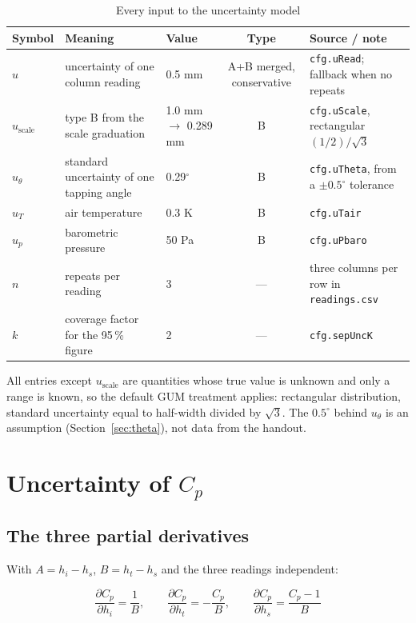 \documentclass[11pt,a4paper]{article}
\newcommand{\Cp}{\ensuremath{C_p}}
\begin{document}
\begin{table}[H]
\centering
\caption{Every input to the uncertainty model}
\small
\begin{tabularx}{\textwidth}{@{}l p{3.4cm} p{2.5cm} c X@{}}
\toprule
Symbol & Meaning & Value & Type & Source / note \\
\midrule
$u$ & uncertainty of one column reading & 0.5 mm & A+B merged, conservative &
\texttt{cfg.uRead}; fallback when no repeats \\
$u_{\text{scale}}$ & type B from the scale graduation & 1.0 mm $\to$ 0.289 mm & B &
\texttt{cfg.uScale}, rectangular $(1/2)/\sqrt{3}$ \\
$u_\theta$ & standard uncertainty of one tapping angle & 0.29$^\circ$ & B &
\texttt{cfg.uTheta}, from a $\pm0.5^\circ$ tolerance \\
$u_T$ & air temperature & 0.3 K & B & \texttt{cfg.uTair} \\
$u_p$ & barometric pressure & 50 Pa & B & \texttt{cfg.uPbaro} \\
$n$ & repeats per reading & 3 & --- & three columns per row in \texttt{readings.csv} \\
$k$ & coverage factor for the 95\,\% figure & 2 & --- & \texttt{cfg.sepUncK} \\
\bottomrule
\end{tabularx}
\end{table}

All entries except $u_{\text{scale}}$ are quantities whose true value is unknown and only a range is
known, so the default GUM treatment applies: rectangular distribution, standard uncertainty equal
to half-width divided by $\sqrt{3}$. The $0.5^\circ$ behind $u_\theta$ is an assumption
(Section~\ref{sec:theta}), not data from the handout.

\section{Uncertainty of \Cp}

\subsection{The three partial derivatives}

With $A = h_i - h_s$, $B = h_t - h_s$ and the three readings independent:

\begin{equation}
\frac{\partial \Cp}{\partial h_i} = \frac{1}{B}, \qquad
\frac{\partial \Cp}{\partial h_t} = -\frac{\Cp}{B}, \qquad
\frac{\partial \Cp}{\partial h_s} = \frac{\Cp - 1}{B}
\end{equation}
\end{document}
